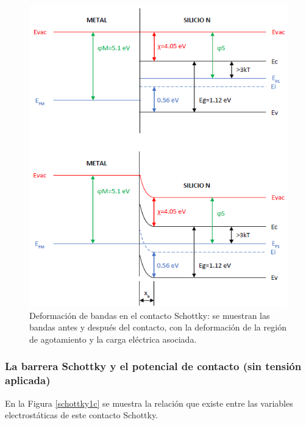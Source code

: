 \begin{figure}[H]
    \centering
    \includegraphics{figuras/contacto_schottky_2.png}
    \caption{Deformación de bandas en el contacto Schottky: se muestran las bandas antes y después del contacto, con la deformación de la región de agotamiento y la carga eléctrica asociada.}
    \label{schottky1b}
\end{figure}

\subsubsection{La barrera Schottky y el potencial de contacto (sin tensión aplicada)}

En la Figura \ref{schottky1c} se muestra la relación que existe entre las variables electrostáticas de este contacto Schottky.

